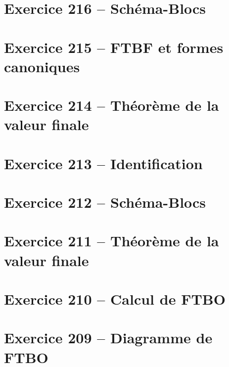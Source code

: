 \documentclass[10pt,fleqn]{article} %
\begin{document}


\vspace{1cm}

\pagestyle{fancy}
\thispagestyle{plain}

\def\columnseprulecolor{\color{ocre}}
\setlength{\columnseprule}{0.4pt} 



\newcommand{\repex}{repex}

\begin{multicols}{2}
\section*{Exercice 216 -- Schéma-Blocs}
\renewcommand{\repex}{001_SchemaBlocs}
\graphicspath{{\repex/images/}}



\section*{Exercice 215 -- FTBF et formes canoniques}
\renewcommand{\repex}{002_FTBF_Canonique}
\graphicspath{{\repex/images/}}


\section*{Exercice 214 -- Théorème de la valeur finale}
\renewcommand{\repex}{003_ValeurFinale}
\graphicspath{{\repex/images/}}


\section*{Exercice 213 -- Identification}
\renewcommand{\repex}{004_IdentificationTemporelle}
\graphicspath{{\repex/images/}}



\section*{Exercice 212 -- Schéma-Blocs}
\renewcommand{\repex}{005_SchemaBlocs2E}
\graphicspath{{\repex/images/}}


\section*{Exercice 211 -- Théorème de la valeur finale}
\renewcommand{\repex}{006_ValeurFinale2E}
\graphicspath{{\repex/images/}}


\section*{Exercice 210 -- Calcul de FTBO}
\renewcommand{\repex}{007_FTBO}
\graphicspath{{\repex/images/}}


\section*{Exercice 209 -- Diagramme de FTBO}
\renewcommand{\repex}{008_Bode}
\graphicspath{{\repex/images/}}



\end{multicols}
\end{document}
